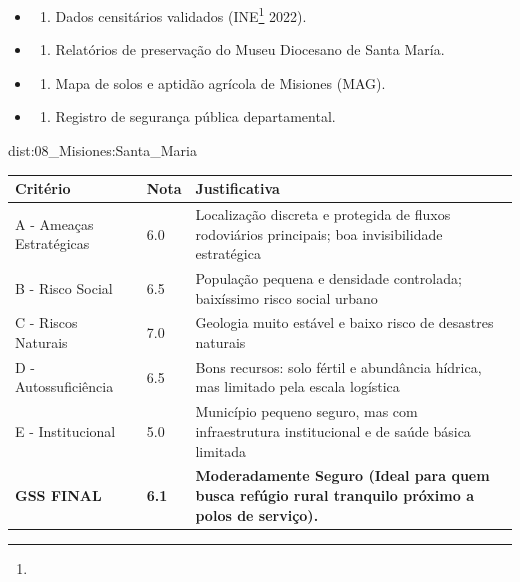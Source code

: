 {\begin{itemize}
\tightlist
\item
  \begin{enumerate}
  \def\labelenumi{\arabic{enumi})}
  \tightlist
  \item
    Dados censitários validados (INE\footnote{\fineINE} 2022).
  \end{enumerate}
\item
  \begin{enumerate}
  \def\labelenumi{\arabic{enumi})}
  \setcounter{enumi}{1}
  \tightlist
  \item
    Relatórios de preservação do Museu Diocesano de Santa María.
  \end{enumerate}
\item
  \begin{enumerate}
  \def\labelenumi{\arabic{enumi})}
  \setcounter{enumi}{2}
  \tightlist
  \item
    Mapa de solos e aptidão agrícola de Misiones (MAG).
  \end{enumerate}
\item
  \begin{enumerate}
  \def\labelenumi{\arabic{enumi})}
  \setcounter{enumi}{3}
  \tightlist
  \item
    Registro de segurança pública departamental.
  \end{enumerate}
\end{itemize}}{dist:08_Misiones:Santa_Maria}
\begin{table}[ht!]
\small \begin{tabular}{p{3.0cm}p{0.8cm}p{6.0cm}} \toprule
\textbf{Critério} & \textbf{Nota} & \textbf{Justificativa} \\ \midrule
A - Ameaças Estratégicas & 6.0 & Localização discreta e protegida de fluxos rodoviários principais; boa invisibilidade estratégica \\
B - Risco Social & 6.5 & População pequena e densidade controlada; baixíssimo risco social urbano \\
C - Riscos Naturais & 7.0 & Geologia muito estável e baixo risco de desastres naturais \\
D - Autossuficiência & 6.5 & Bons recursos: solo fértil e abundância hídrica, mas limitado pela escala logística \\
E - Institucional & 5.0 & Município pequeno seguro, mas com infraestrutura institucional e de saúde básica limitada \\
\midrule \textbf{GSS FINAL} & \textbf{6.1} & \textbf{Moderadamente Seguro (Ideal para quem busca refúgio rural tranquilo próximo a polos de serviço).} \\ \bottomrule \end{tabular}
\end{table}
